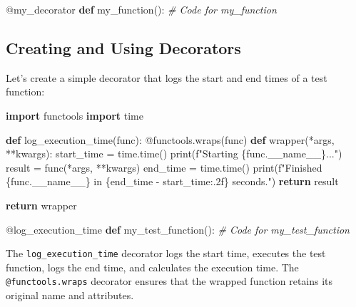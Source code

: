 \documentclass[
  paper=a4,
  ,captions=tableheading
]{scrartcl}
\newenvironment{Shaded}{}{}
\newcommand{\AttributeTok}[1]{\textcolor[rgb]{0.49,0.56,0.16}{#1}}
\newcommand{\BuiltInTok}[1]{\textcolor[rgb]{0.00,0.50,0.00}{#1}}
\newcommand{\CommentTok}[1]{\textcolor[rgb]{0.38,0.63,0.69}{\textit{#1}}}
\newcommand{\ControlFlowTok}[1]{\textcolor[rgb]{0.00,0.44,0.13}{\textbf{#1}}}
\newcommand{\ImportTok}[1]{\textcolor[rgb]{0.00,0.50,0.00}{\textbf{#1}}}
\newcommand{\KeywordTok}[1]{\textcolor[rgb]{0.00,0.44,0.13}{\textbf{#1}}}
\newcommand{\NormalTok}[1]{#1}
\newcommand{\OperatorTok}[1]{\textcolor[rgb]{0.40,0.40,0.40}{#1}}
\newcommand{\SpecialCharTok}[1]{\textcolor[rgb]{0.25,0.44,0.63}{#1}}
\newcommand{\SpecialStringTok}[1]{\textcolor[rgb]{0.73,0.40,0.53}{#1}}
\newcommand{\VariableTok}[1]{\textcolor[rgb]{0.10,0.09,0.49}{#1}}
\begin{document}
\begin{Shaded}
\begin{Highlighting}[]
\AttributeTok{@my\_decorator}
\KeywordTok{def}\NormalTok{ my\_function():}
    \CommentTok{\# Code for my\_function}
\end{Highlighting}
\end{Shaded}

\hypertarget{creating-and-using-decorators}{%
\subsection{Creating and Using
Decorators}\label{creating-and-using-decorators}}

Let's create a simple decorator that logs the start and end times of a
test function:

\begin{Shaded}
\begin{Highlighting}[]
\ImportTok{import}\NormalTok{ functools}
\ImportTok{import}\NormalTok{ time}

\KeywordTok{def}\NormalTok{ log\_execution\_time(func):}
    \AttributeTok{@functools.wraps}\NormalTok{(func)}
    \KeywordTok{def}\NormalTok{ wrapper(}\OperatorTok{*}\NormalTok{args, }\OperatorTok{**}\NormalTok{kwargs):}
\NormalTok{        start\_time }\OperatorTok{=}\NormalTok{ time.time()}
        \BuiltInTok{print}\NormalTok{(}\SpecialStringTok{f"Starting }\SpecialCharTok{\{}\NormalTok{func}\SpecialCharTok{.}\VariableTok{\_\_name\_\_}\SpecialCharTok{\}}\SpecialStringTok{..."}\NormalTok{)}
\NormalTok{        result }\OperatorTok{=}\NormalTok{ func(}\OperatorTok{*}\NormalTok{args, }\OperatorTok{**}\NormalTok{kwargs)}
\NormalTok{        end\_time }\OperatorTok{=}\NormalTok{ time.time()}
        \BuiltInTok{print}\NormalTok{(}\SpecialStringTok{f"Finished }\SpecialCharTok{\{}\NormalTok{func}\SpecialCharTok{.}\VariableTok{\_\_name\_\_}\SpecialCharTok{\}}\SpecialStringTok{ in }\SpecialCharTok{\{}\NormalTok{end\_time }\OperatorTok{{-}}\NormalTok{ start\_time}\SpecialCharTok{:.2f\}}\SpecialStringTok{ seconds."}\NormalTok{)}
        \ControlFlowTok{return}\NormalTok{ result}

    \ControlFlowTok{return}\NormalTok{ wrapper}

\AttributeTok{@log\_execution\_time}
\KeywordTok{def}\NormalTok{ my\_test\_function():}
    \CommentTok{\# Code for my\_test\_function}
\end{Highlighting}
\end{Shaded}

The \texttt{log\_execution\_time} decorator logs the start time,
executes the test function, logs the end time, and calculates the
execution time. The \texttt{@functools.wraps} decorator ensures that the
wrapped function retains its original name and attributes.
\end{document}
